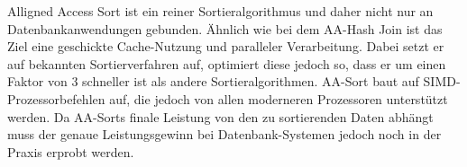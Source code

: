 Alligned Access Sort ist ein reiner Sortieralgorithmus und daher nicht nur an Datenbankanwendungen gebunden. Ähnlich wie bei dem AA-Hash Join ist das Ziel eine geschickte Cache-Nutzung und paralleler Verarbeitung. Dabei setzt er auf bekannten Sortierverfahren auf, optimiert diese jedoch so, dass er um einen Faktor von 3 schneller ist als andere Sortieralgorithmen. AA-Sort baut auf SIMD-Prozessorbefehlen auf, die jedoch von allen moderneren Prozessoren unterstützt werden. Da AA-Sorts finale Leistung von den zu sortierenden Daten abhängt muss der genaue Leistungsgewinn bei Datenbank-Systemen jedoch noch in der Praxis erprobt werden.


